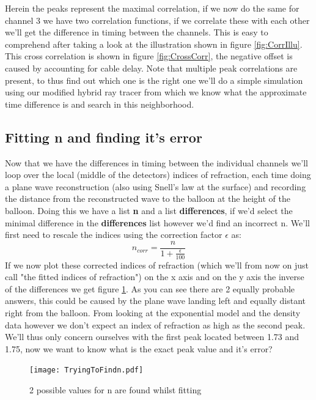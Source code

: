 Herein the peaks represent the maximal correlation, if we now do the same for
channel 3 we have two correlation functions, if we correlate these with
each other we'll get the difference in timing between the channels.  This is
easy to comprehend after taking a look at the illustration shown in figure
\ref{fig:CorrIllu}. This cross correlation is shown in figure
\ref{fig:CrossCorr}, the negative offset is caused by accounting for cable
delay. Note that multiple peak correlations are present, to thus find out which
one is the right one we'll do a simple simulation using our modified hybrid ray
tracer from which we know what the approximate time difference is and search in
this neighborhood.

\subsection{Fitting n and finding it's error}
Now that we have the differences in timing between the individual channels we'll loop
over the local (middle of the detectors) indices of refraction, each time doing a plane
wave reconstruction (also using Snell's law at the surface) and recording the distance
from the reconstructed wave to the balloon at the height of the balloon.
Doing this we have a list \textbf{n} and a list \textbf{differences}, if we'd select
the minimal difference in the \textbf{differences} list however we'd find an incorrect
n. We'll first need to rescale the indices using the correction factor $\epsilon$ as:
\begin{equation}
	n_{corr} = \frac{n}{1+\frac{\epsilon}{100}}
\end{equation}
If we now plot these corrected indices of refraction (which we'll from now on
just call "the fitted indices of refraction") on the x axis and on the y axis
the inverse of the differences we get figure \ref{fig:2PeakFit}. As you can
see there are 2 equally probable answers, this could be caused by the plane
wave landing left and equally distant right from the balloon. From looking at
the exponential model and the density data however we don't expect an index of
refraction as high as the second peak. We'll thus only concern ourselves with
the first peak located between 1.73 and 1.75, now we want to know what is the
exact peak value and it's error?
\begin{figure}
	\centering
	\texttt{[image: TryingToFindn.pdf]}
	\caption{2 possible values for n are found whilst fitting}
	\label{fig:2PeakFit}
\end{figure}

